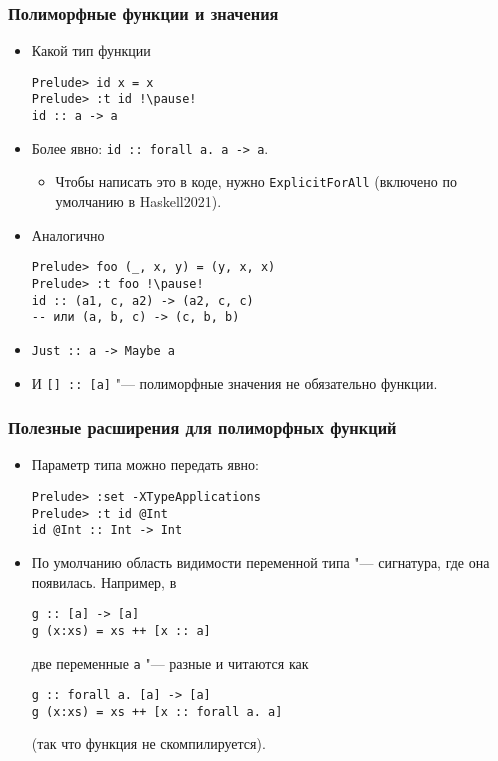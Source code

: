 \documentclass[10pt]{beamer}
\begin{document}
\begin{frame}[fragile]
\frametitle{Полиморфные функции и значения}
\begin{itemize}
    \item Какой тип функции
\begin{lstlisting}
Prelude> id x = x
Prelude> :t id !\pause!
id :: a -> a
\end{lstlisting}
\item Более явно: \lstinline|id :: forall a. a -> a|.
\begin{itemize}
\item Чтобы написать это в коде, нужно \lstinline|ExplicitForAll| (включено по умолчанию в Haskell2021).
\end{itemize}
\item Аналогично
\begin{lstlisting}
Prelude> foo (_, x, y) = (y, x, x)
Prelude> :t foo !\pause!
id :: (a1, c, a2) -> (a2, c, c) 
-- или (a, b, c) -> (c, b, b)
\end{lstlisting}
\item \lstinline|Just :: a -> Maybe a|
\item И \lstinline|[] :: [a]| "--- полиморфные значения не обязательно функции.
\end{itemize}
\end{frame}

\begin{frame}[fragile]
\frametitle{Полезные расширения для полиморфных функций}
\begin{itemize}
    \item Параметр типа можно передать явно:
\begin{lstlisting}
Prelude> :set -XTypeApplications
Prelude> :t id @Int
id @Int :: Int -> Int
\end{lstlisting}
    \pause
    \item По умолчанию область видимости переменной типа "--- сигнатура, где она появилась. Например, в
\begin{lstlisting}
g :: [a] -> [a]
g (x:xs) = xs ++ [x :: a]
\end{lstlisting}
    \pause
    две переменные \lstinline|a| "--- разные и читаются как
\begin{lstlisting}
g :: forall a. [a] -> [a]
g (x:xs) = xs ++ [x :: forall a. a]
\end{lstlisting}
    \pause
    (так что функция не скомпилируется). 
\end{itemize}
\end{frame}
\end{document}
